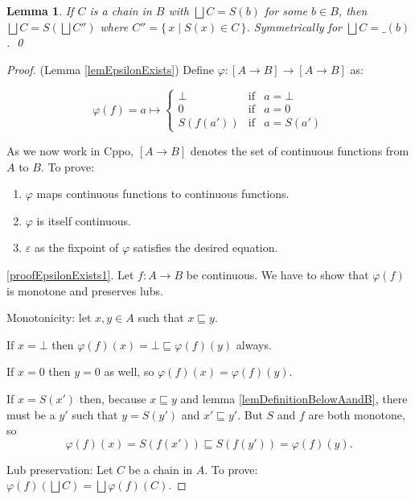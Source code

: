 \documentclass[a4paper]{article}
\newcommand{\below}{\sqsubseteq}
\newcommand{\arr}{\rightarrow}
\newcommand{\lub}{\bigsqcup}
\newcommand{\set}[1]{\{\,#1\,\}}
\newtheorem{lemma}[definition]{Lemma}
\begin{document}
\begin{lemma} \label{lemChainInversionB}
If $C$ is a chain in $B$ with $\lub C = S(b)$ for some $b \in B$, then $\lub C =
S(\lub C'')$ where $C'' = \set{x \mid S(x) \in C}$. Symmetrically for $\lub C =
\_(b)$. \qed
\end{lemma}


\begin{proof}

(Lemma \ref{lemEpsilonExists}) Define $\varphi : [A \arr B] \arr [A \arr B]$ as:

\begin{equation*}
\varphi(f) = a \mapsto \left\{
  \begin{array}{rcl}
   \bot & \text{if} & a = \bot \\
   0 & \text{if} & a = 0 \\
   S(f(a')) & \text{if} & a = S(a')
  \end{array}
\right.
\end{equation*}

As we now work in Cppo, $[A \arr B]$ denotes the set of continuous functions
from $A$ to $B$. To prove:
\begin{enumerate}[noitemsep]
\item \label{proofEpsilonExists1} $\varphi$ maps continuous functions to
continuous functions.
\item \label{proofEpsilonExists2} $\varphi$ is itself continuous.
\item \label{proofEpsilonExists3} $\varepsilon$ as the fixpoint of $\varphi$
satisfies the desired equation.
\end{enumerate}

\ref{proofEpsilonExists1}. Let $f : A \arr B$ be continuous. We have to show
that $\varphi(f)$ is monotone and preserves lubs.

Monotonicity: let $x, y \in A$ such that $x \below y$.

If $x = \bot$ then $\varphi(f)(x) = \bot \below \varphi(f)(y)$ always.

If $x = 0$ then $y = 0$ as well, so $\varphi(f)(x) = \varphi(f)(y)$.

If $x = S(x')$ then, because $x \below y$ and lemma \ref{lemDefinitionBelowAandB}, there must be a $y'$ such that $y =
S(y')$ and $x' \below y'$. But $S$ and $f$ are both monotone, so
\begin{equation*}
\varphi(f)(x) = S(f(x')) \below S(f(y')) = \varphi(f)(y).
\end{equation*}

Lub preservation: Let $C$ be a chain in $A$. To prove: $\varphi(f)(\lub C) =
\lub \varphi(f)(C)$.


\end{proof}
\end{document}
